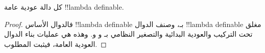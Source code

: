 \documentclass[../../../include/open-logic-section]{subfiles}
\begin{document}
\begin{prop}
  كل دالة عودية عامة !!{lambda definable}.
\end{prop}

\begin{proof}
 فالدوال الأساس !!{lambda definable} بـ،
 وصنف الدوال !!{lambda definable} مغلق تحت التركيب والعودية البدائية والتصغير النظامي
 بـ و و.
 وهذه هي عمليات بناء الدوال العودية العامة، فيثبت المطلوب.
\end{proof}
\end{document}
